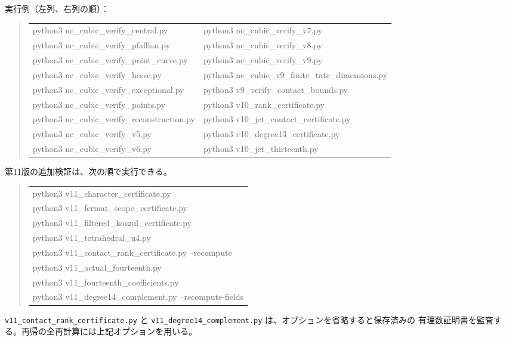 \documentclass[a4paper,11pt]{ltjsarticle}
\theoremstyle{definition}
\begin{document}
実行例（左列、右列の順）：
\begin{quote}\footnotesize\ttfamily
\begin{tabular}{@{}ll@{}}
python3 nc\_cubic\_verify\_central.py & python3 nc\_cubic\_verify\_v7.py \\
python3 nc\_cubic\_verify\_pfaffian.py & python3 nc\_cubic\_verify\_v8.py \\
python3 nc\_cubic\_verify\_point\_curve.py & python3 nc\_cubic\_verify\_v9.py \\
python3 nc\_cubic\_verify\_hesse.py & python3 nc\_cubic\_v9\_finite\_tate\_dimensions.py \\
python3 nc\_cubic\_verify\_exceptional.py & python3 v9\_verify\_contact\_bounds.py \\
python3 nc\_cubic\_verify\_points.py & python3 v10\_rank\_certificate.py \\
python3 nc\_cubic\_verify\_reconstruction.py & python3 v10\_jet\_contact\_certificate.py \\
python3 nc\_cubic\_verify\_v5.py & python3 v10\_degree13\_certificate.py \\
python3 nc\_cubic\_verify\_v6.py & python3 v10\_jet\_thirteenth.py \\
\end{tabular}
\end{quote}

第11版の追加検証は、次の順で実行できる。
\begin{quote}\footnotesize\ttfamily
\begin{tabular}{@{}l@{}}
python3 v11\_character\_certificate.py\\
python3 v11\_fermat\_scope\_certificate.py\\
python3 v11\_filtered\_koszul\_certificate.py\\
python3 v11\_tetrahedral\_u4.py\\
python3 v11\_contact\_rank\_certificate.py --recompute\\
python3 v11\_actual\_fourteenth.py\\
python3 v11\_fourteenth\_coefficients.py\\
python3 v11\_degree14\_complement.py --recompute-fields\\
\end{tabular}
\end{quote}
\texttt{v11\_contact\_rank\_certificate.py} と
\texttt{v11\_degree14\_complement.py} は、オプションを省略すると保存済みの
有理数証明書を監査する。再帰の全再計算には上記オプションを用いる。
\end{document}
